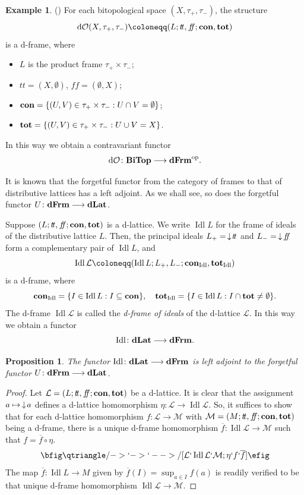 \documentclass[11pt]{article}
\DeclareMathOperator{\idl}{Idl}
\DeclareMathOperator{\dO}{d\mathcal{O}}
\theoremstyle{plain}
\newtheorem{prop}[thm]{Proposition}
\theoremstyle{definition}
\newtheorem{exmp}[thm]{Example}
\newcommand{\dbt}{{t\!t}}
\newcommand{\dbf}{{f\!\!f}}
\newcommand{\dLat}{\bf dLat}
\newcommand{\dFrm}{\bf dFrm}
\newcommand{\lra}{\longrightarrow}
\begin{document}
 \begin{exmp}\label{dO}(\cite{JM2006,JM2008}) For each bitopological space $(X, \tau_+, \tau_-)$, the structure  $$\dO(X, \tau_+, \tau_-)\coloneqq (L;\dbt,\dbf;{\bf con},{\bf tot})$$  is a d-frame, where  \begin{itemize} \setlength{\itemsep}{0pt}
 \item $L$ is the product frame $\tau_+\times\tau_-$; \item $\dbt=(X,\emptyset)$, $\dbf=(\emptyset,X)$; \item ${\bf con}=\{(U,V)\in \tau_+\times\tau_-: U\cap V=\emptyset\}$;   \item ${\bf tot}=\{(U,V)\in \tau_+\times\tau_-: U\cup V=X\}$. \end{itemize} 
In this way we obtain a contravariant functor $$\dO\colon {\bf BiTop}\lra {\bf dFrm}^{\rm op}.$$  
\end{exmp} 

It is known that the forgetful functor from the category of frames to that of distributive lattices has a left adjoint. As we shall see, so does the forgetful functor $U\colon \dFrm\longrightarrow\dLat$. 

Suppose  $(L;\dbt,\dbf;{\bf con},{\bf tot})$ is a d-lattice. We write $\idl L$ for the frame of ideals of the distributive lattice $L$. Then, the principal ideals $L_+=\thinspace\downarrow\!\dbt$ and $L_-=\thinspace\downarrow\!\dbf$ form a complementary pair of $\idl L$, and $$\idl\mathcal{L}\coloneqq(\idl L;L_+,L_-;{\bf con}_{\idl},{\bf tot}_{\idl})$$
is a d-frame,  where $${\bf con}_{\idl}=\{I\in\idl L: I\subseteq {\bf con}\},\quad {\bf tot}_{\idl}=\{I\in \idl L: I\cap {\bf tot}\neq\emptyset\}.$$ The d-frame $\idl\mathcal{L}$ is called the \emph{d-frame of ideals} of the d-lattice $\mathcal{L}$. In this way we obtain a functor
 $$\idl\colon \dLat\longrightarrow\dFrm.$$  
 
\begin{prop}\label{idl left adjoint to forgetful} The functor $\idl\colon \dLat\longrightarrow\dFrm$  is left adjoint to the  forgetful functor $U\colon \dFrm\longrightarrow\dLat$.  
\end{prop}

\begin{proof} Let 
$\mathcal{L} =(L;\dbt,\dbf; {\bf con},{\bf tot})$ be a d-lattice.  It is clear that the assignment $a\mapsto \thinspace \downarrow\!a$ defines a d-lattice homomorphism $\eta\colon \mathcal{L}\lra \idl\mathcal{L}$. So, it suffices to show that for each d-lattice homomorphism $f\colon\mathcal{L} \longrightarrow\mathcal{M}$ with $\mathcal{M}=(M;\dbt,\dbf;{\bf con},{\bf tot})$ being a d-frame, there is a unique d-frame homomorphism $\overline{f}\colon \idl\mathcal{L}\lra\mathcal{M}$ such that  $f= \overline{f}\circ \eta$.
$$\bfig\qtriangle/->`->`-->/[\mathcal{L}`\idl\mathcal{L}`\mathcal{M};\eta` f`\overline{f}]\efig$$
The map   $\overline{f}\colon\idl L\longrightarrow M$ given by $\overline{f}(I)=\sup_{a\in I} f(a)$  is readily verified to be that unique d-frame homomorphism $\idl\mathcal{L} \lra\mathcal{M}$.
\end{proof}
\end{document}
